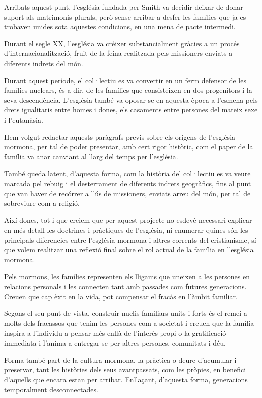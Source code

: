     Arribats aquest punt, l'església fundada per Smith va decidir deixar de donar suport als matrimonis plurals, però sense arribar a desfer les famílies que ja es trobaven unides sota aquestes condicions, en una mena de pacte intermedi.

    Durant el segle XX, l'església va créixer substancialment gràcies a un procés d'internacionalització, fruit de la feina realitzada pels missioners enviats a diferents indrets del món.

    Durant aquest període, el col·lectiu es va convertir en un ferm defensor de les famílies nuclears, és a dir, de les famílies que consisteixen en dos progenitors i la seva descendència. L'església també va oposar-se en aquesta època a l'esmena pels drets igualitaris entre homes i dones, els casaments entre persones del mateix sexe i l'eutanàsia.

    Hem volgut redactar aquests paràgrafs previs sobre els orígens de l'església mor\-mo\-na, per tal de poder presentar, amb cert rigor històric, com el paper de la família va anar canviant al llarg del temps per l'església.

    També queda latent, d'aquesta forma, com la història del col·lectiu es va veure marcada pel rebuig i el desterrament de diferents indrets geogràfics, fins al punt que van haver de recórrer a l'ús de missioners, enviats arreu del món, per tal de sobreviure com a religió.

    Així doncs, tot i que creiem que per aquest projecte no esdevé necessari explicar en més detall les doctrines i pràctiques de l'església, ni  enumerar quines són les principals diferencies entre l'església mormona i altres corrents del cristianisme, sí que volem realitzar una reflexió final sobre el rol actual de la família en l'església mormona.

    Pels mormons, les famílies representen els lligams que uneixen a les persones en relacions personals i les connecten tant amb passades com futures generacions. Creuen que cap èxit en la vida, pot compensar el fracàs en l'àmbit familiar.

    Segons el seu punt de vista, construir nuclis familiars units i forts és el remei a molts dels fracassos que tenim les persones com a societat i creuen que la família inspira a l'individu a pensar més enllà de l'interès propi o la gratificació immediata i l'anima a entregar-se per altres persones, comunitats i déu.

    Forma també part de la cultura mormona, la pràctica o deure d'acumular i preservar, tant les històries dels seus avantpassats, com les pròpies, en benefici d'aquells que encara estan per arribar. Enllaçant, d'aquesta forma, generacions temporalment desconnectades.

